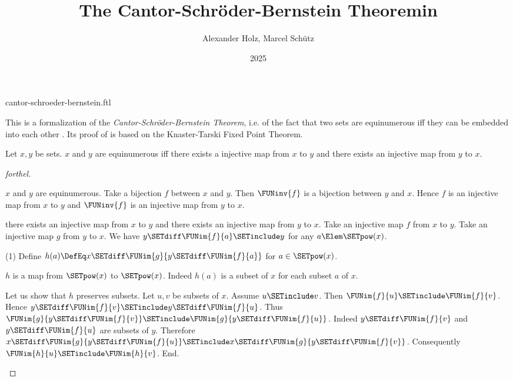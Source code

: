 \documentclass{stex}
\title{The Cantor-Schröder-Bernstein Theoremin \Naproche}
\author{Alexander Holz, Marcel Schütz}
\date{2025}
\begin{document}
\begin{smodule}{cantor-schroeder-bernstein.ftl}
\maketitle



\noindent This is a formalization of the \textit{Cantor-Schröder-Bernstein
Theorem}, i.e. of the fact that two sets are equinumerous iff they can be
embedded into each other \cite{Schroeder2012}.
Its proof of is based on the Knaster-Tarski Fixed Point Theorem.

\begin{theorem}[forthel,title=Cantor-Schröder-Bernstein,name=Cantor-Schroeder-Bernstein]
  Let $x,y$ be sets.
  $x$ and $y$ are equinumerous iff there exists a injective map from $x$ to $y$ and there exists an injective map from $y$ to $x$.
\end{theorem}
\begin{proof}[forthel]
  \begin{case}{$x$ and $y$ are equinumerous.}
    Take a bijection $f$ between $x$ and $y$.
    Then $\FUNinv{f}$ is a bijection between $y$ and $x$.
    Hence $f$ is an injective map from $x$ to $y$ and $\FUNinv{f}$ is an
    injective map from $y$ to $x$.
  \end{case}

  \begin{case}{there exists an injective map from $x$ to $y$ and there exists an injective map from $y$ to $x$.}
    Take an injective map $f$ from $x$ to $y$.
    Take an injective map $g$ from $y$ to $x$.
    We have $y \SETdiff \FUNim{f}{a} \SETinclude y$ for any $a \Elem \SETpow(x)$.

    (1) Define $h(a) \DefEq x \SETdiff \FUNim{g}{y \SETdiff \FUNim{f}{a}}$ for $a \in \SETpow(x)$.

    $h$ is a map from $\SETpow(x)$ to $\SETpow(x)$.
    Indeed $h(a)$ is a subset of $x$ for each subset $a$ of $x$.

    Let us show that $h$ preserves subsets.
      Let $u, v$ be subsets of $x$.
      Assume $u \SETinclude v$.
      Then $\FUNim{f}{u} \SETinclude \FUNim{f}{v}$.
      Hence $y \SETdiff \FUNim{f}{v} \SETinclude y \SETdiff \FUNim{f}{u}$.
      Thus $\FUNim{g}{y \SETdiff \FUNim{f}{v}} \SETinclude\linebreak \FUNim{g}{y \SETdiff \FUNim{f}{u}}$.
      Indeed $y \SETdiff \FUNim{f}{v}$ and $y \SETdiff \FUNim{f}{u}$ are subsets of $y$.
      Therefore\linebreak $x \SETdiff \FUNim{g}{y \SETdiff \FUNim{f}{u}} \SETinclude x \SETdiff \FUNim{g}{y \SETdiff \FUNim{f}{v}}$.
      Consequently $\FUNim{h}{u} \SETinclude \FUNim{h}{v}$.
    End.


\end{case}
\end{proof}
\end{smodule}
\end{document}
